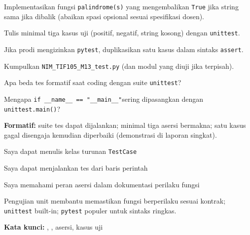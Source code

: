 \documentclass[../main.tex]{subfiles}
\begin{document}
\begin{aktivitas}
  \item Implementasikan fungsi \texttt{palindrome(s)} yang mengembalikan \texttt{True} jika string sama jika dibalik (abaikan spasi opsional sesuai spesifikasi dosen).
  \item Tulis minimal tiga kasus uji (positif, negatif, string kosong) dengan \texttt{unittest}.
  \item Jika prodi mengizinkan \texttt{pytest}, duplikasikan satu kasus dalam sintaks \texttt{assert}.
  \item Kumpulkan \texttt{NIM\_TIF105\_M13\_test.py} (dan modul yang diuji jika terpisah).
\end{aktivitas}

\begin{latihan}
  \item Apa beda tes formatif saat coding dengan suite \texttt{unittest}?
  \item Mengapa \texttt{if \_\_name\_\_ == "\_\_main\_\_"}\newline sering dipasangkan dengan \texttt{unittest.main()}?
\end{latihan}

\begin{asesmen}
\textbf{Formatif:} suite tes dapat dijalankan; minimal tiga asersi bermakna; satu kasus gagal disengaja kemudian diperbaiki (demonstrasi di laporan singkat).
\end{asesmen}

\begin{checklist}
  \item Saya dapat menulis kelas turunan \texttt{TestCase}
  \item Saya dapat menjalankan tes dari baris perintah
  \item Saya memahami peran asersi dalam dokumentasi perilaku fungsi
\end{checklist}

\begin{rangkuman}
Pengujian unit membantu memastikan fungsi berperilaku sesuai kontrak; \texttt{unittest} built-in; \texttt{pytest} populer untuk sintaks ringkas.

\textbf{Kata kunci:} , , asersi, kasus uji
\end{rangkuman}
\end{document}
